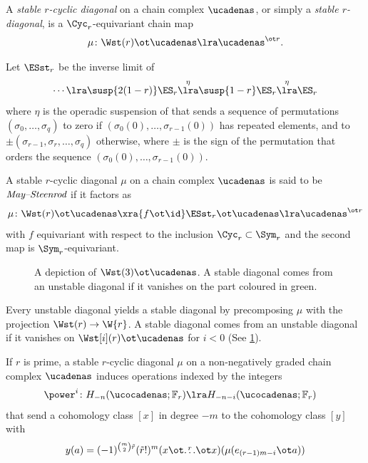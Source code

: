 \begin{definition}
	A \emph{stable $r$-cyclic diagonal} on a chain complex $\ucadenas$, or simply a \textit{stable $r$-diagonal}, is a $\Cyc_r$-equivariant chain map
	\[
	\mu \colon \Wst(r) \ot \ucadenas \lra \ucadenas^{\ot r}.
	\]
\end{definition}

\begin{definition}
	Let $\ESst_r$ be the inverse limit of
	\[
	\dotsb \lra \susp{2(1-r)} \ES_r\overset{\eta}{\lra}\susp{1-r} \ES_r\overset{\eta}{\lra} \ES_r
	\]
	where $\eta$ is the operadic suspension of \cite{berger2004combinatorial} that sends a sequence of permutations $(\sigma_0,\dots,\sigma_q)$ to zero if $(\sigma_0(0),\dots,\sigma_{r-1}(0))$ has repeated elements, and to $\pm (\sigma_{r-1},\sigma_r,\dots,\sigma_q)$ otherwise, where $\pm$ is the sign of the permutation that orders the sequence $(\sigma_0(0),\dots,\sigma_{r-1}(0))$.
\end{definition}

\begin{definition}
	A stable $r$-cyclic diagonal $\mu$ on a chain complex $\ucadenas$ is said to be $\emph{May--Steenrod}$ if it factors as
	\[
	\mu \colon \Wst(r) \ot \ucadenas \xra{f \ot \id} \ESst_r \ot \ucadenas \lra \ucadenas^{\ot r}
	\]
	with $f$ equivariant with respect to the inclusion $\Cyc_r \subset \Sym_r$ and the second map is $\Sym_r$-equivariant.
\end{definition}

\begin{figure}
	
	\caption{A depiction of $\Wst(3) \ot \ucadenas$. A stable diagonal comes from an unstable diagonal if it vanishes on the part coloured in green.}
	\label{figure:1}
\end{figure}

Every unstable diagonal yields a stable diagonal by precomposing $\mu$ with the projection $\Wst(r) \to \W{r}$.
A stable diagonal comes from an unstable diagonal if it vanishes on $\Wst[i](r) \ot \ucadenas$ for $i<0$ (See \cref{figure:1}).

\begin{proposition}
	If $r$ is prime, a stable $r$-cyclic diagonal $\mu$ on a non-negatively graded chain complex $\ucadenas$ induces operations indexed by the integers
	\begin{align*}
		\power^{i} \colon H_{-n}(\ucocadenas;\mathbb{F}_r)& \lra H_{-n-i}(\ucocadenas;\mathbb{F}_r)
	\end{align*}
	that send a cohomology class $[x]$ in degree $-m$ to the cohomology class $[y]$ with
	\[
	y(a) = (-1)^{\binom{m}{2} \tilde{r}}(\tilde{r}!)^m(x \ot \overset{r}{\dots} \ot x)(\mu(e_{(r-1)m-i} \ot a))
	\]
\end{proposition}


